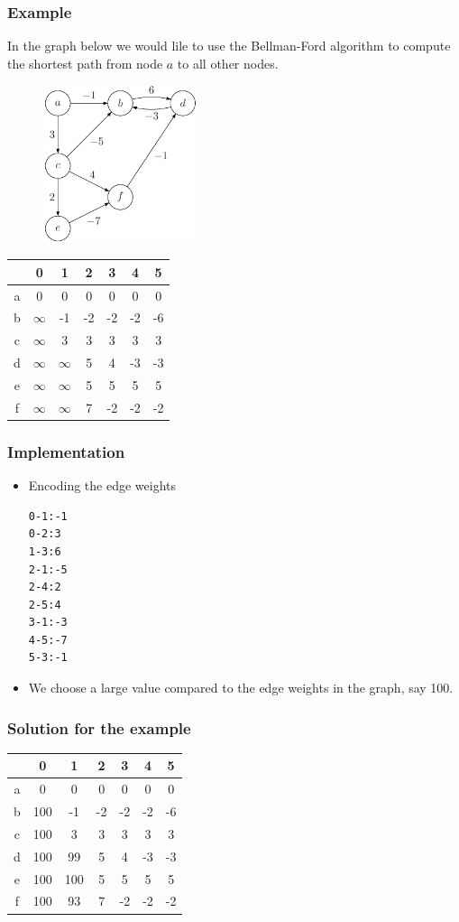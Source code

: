 \documentclass{beamer}
\begin{document}
\begin{frame}
  \frametitle{Example}
  In the graph below we would lile to use the Bellman-Ford algorithm
  to compute the shortest path from node $a$ to all other nodes.
  \begin{figure}[h]
    \centering
\includegraphics[width=0.4\textwidth]{dp-figs/bellman-ford}
  \end{figure}
\end{frame}
\begin{frame}
  \begin{tabular}[h]{c|cccccc}
    &0 & 1& 2 & 3 & 4 &5\\
   \hline
   a&    0&0&0&0&0&0\\
   b& $\infty$ &-1&-2&-2&-2&-6\\
   c& $\infty$ &3&3&3&3&3\\
   d& $\infty$ & $\infty$ &5&4&-3&-3\\
   e& $\infty$ & $\infty$ &5&5&5&5\\
   f& $\infty$ & $\infty$ &7&-2&-2&-2
     \end{tabular}
\end{frame}
\begin{frame}[fragile]
  \frametitle{Implementation}
  \begin{itemize}
  \item Encoding the edge weights
\begin{verbatim}
0-1:-1
0-2:3
1-3:6
2-1:-5
2-4:2
2-5:4
3-1:-3
4-5:-7
5-3:-1
\end{verbatim}
  \item We choose a large value compared to the edge weights in the graph, say 100.
  \end{itemize}

\end{frame}
\begin{frame}
\frametitle{Solution for the example}
  \begin{tabular}[h]{c|cccccc}
 &0 & 1& 2 & 3 & 4 &5\\
\hline
a&    0&0&0&0&0&0\\
b&100&-1&-2&-2&-2&-6\\
c&100&3&3&3&3&3\\
d&100&99&5&4&-3&-3\\
e&100&100&5&5&5&5\\
f&100&93&7&-2&-2&-2
  \end{tabular}
\end{frame}
\end{document}
